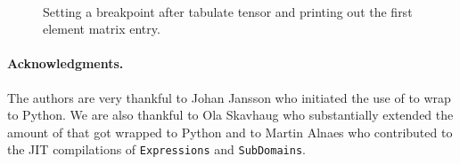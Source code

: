 \begin{figure}
   \\
\caption{Setting a breakpoint after tabulate tensor and printing out the first element matrix entry.}
\label{fig5}
\end{figure}

\paragraph{Acknowledgments.}
The authors are very thankful to Johan Jansson who initiated the use of \swig to wrap \dolfin to Python. We are also thankful to Ola Skavhaug who substantially extended the amount of \dolfin that got wrapped to Python and to Martin Alnaes who contributed to the JIT compilations of \texttt{Expressions} and \texttt{SubDomains}.

